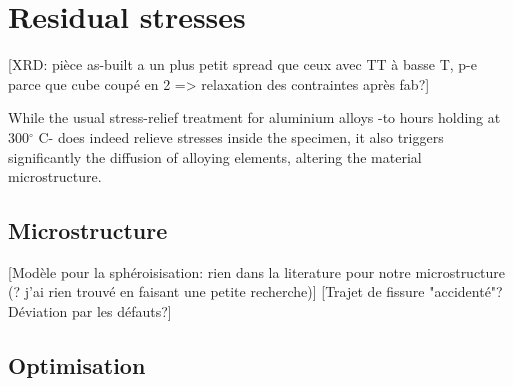 \section{Residual stresses}

[XRD: pièce as-built a un plus petit spread que ceux avec TT à basse T, p-e parce que cube coupé en 2 => relaxation des contraintes après fab?]

While the usual stress-relief treatment for aluminium alloys -to hours holding at 300$^\circ$ C- does indeed relieve stresses inside the specimen, it also triggers significantly the diffusion of alloying elements, altering the material microstructure.

\subsection{Microstructure}
[Modèle pour la sphéroisisation: rien dans la literature pour notre microstructure (? j'ai rien trouvé en faisant une petite recherche)]
[Trajet de fissure "accidenté"? Déviation par les défauts?]


\label{D-MP}

\subsection{Optimisation}



